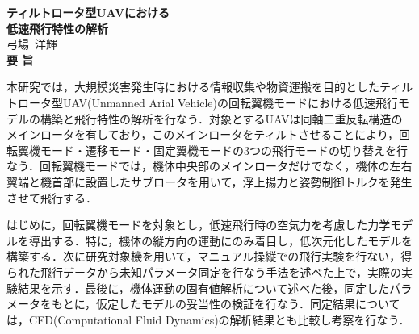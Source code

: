 
\begin{titlepage}
\begin{center}
{\LARGE \bf ティルトロータ型UAVにおける\\低速飛行特性の解析}
\\[0.5cm]
{\Large 弓場~洋輝}
\\[1.0cm]
{\LARGE \bf 要\vspace{36pt}   旨\\}
\end{center}

本研究では，大規模災害発生時における情報収集や物資運搬を目的としたティルトロータ型UAV(Unmanned Arial Vehicle)の回転翼機モードにおける低速飛行モデルの構築と飛行特性の解析を行なう．対象とするUAVは同軸二重反転構造のメインロータを有しており，このメインロータをティルトさせることにより，回転翼機モード・遷移モード・固定翼機モードの3つの飛行モードの切り替えを行なう．回転翼機モードでは，機体中央部のメインロータだけでなく，機体の左右翼端と機首部に設置したサブロータを用いて，浮上揚力と姿勢制御トルクを発生させて飛行する．

はじめに，回転翼機モードを対象とし，低速飛行時の空気力を考慮した力学モデルを導出する．特に，機体の縦方向の運動にのみ着目し，低次元化したモデルを構築する．次に研究対象機を用いて，マニュアル操縦での飛行実験を行ない，得られた飛行データから未知パラメータ同定を行なう手法を述べた上で，実際の実験結果を示す．最後に，機体運動の固有値解析について述べた後，同定したパラメータをもとに，仮定したモデルの妥当性の検証を行なう．同定結果については，CFD(Computational Fluid Dynamics)の解析結果とも比較し考察を行なう．

\end{titlepage}

